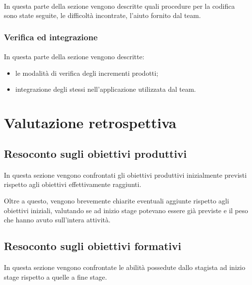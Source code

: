\documentclass[
article,
10pt, %
oneside, %
BCOR5mm, %
]{scrartcl}
\begin{document}
\paragraph{} In questa parte della sezione vengono descritte quali procedure
per la codifica sono state seguite, le difficoltà incontrate, l'aiuto fornito
dal team.

\subsubsection{Verifica ed integrazione}
\paragraph{} In questa parte della sezione vengono descritte:

\begin{itemize}
\item le modalità di verifica degli incrementi prodotti;
\item integrazione degli stessi nell'applicazione utilizzata dal team.
\end{itemize}



\section{Valutazione retrospettiva} %

\subsection{Resoconto sugli obiettivi produttivi}
\paragraph{} In questa sezione vengono confrontati gli obiettivi produttivi
inizialmente previsti rispetto agli obiettivi effettivamente raggiunti.

Oltre a questo, vengono brevemente chiarite eventuali aggiunte rispetto agli
obiettivi iniziali, valutando se ad inizio stage potevano essere già previste
e il peso che hanno avuto sull'intera attività.

\subsection{Resoconto sugli obiettivi formativi}
\paragraph{} In questa sezione vengono confrontate le abilità possedute dallo
stagista ad inizio stage rispetto a quelle a fine stage.
\end{document}
